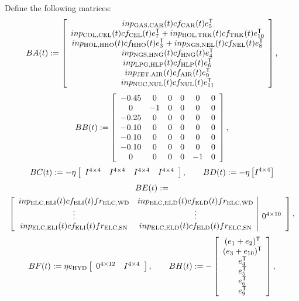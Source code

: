 Define the following matrices:
\[
BA(t)\assign \left[\ajfbox{%
inp_{\text{GAS,CAR}}(t)cf_{\text{CAR}}(t)e_{5}\trp\\
inp_{\text{COL,CEL}}(t)cf_{\text{CEL}}(t)e_{7}\trp + inp_{\text{HOL,TRK}}(t)cf_{\text{TRK}}(t)e_{10}\trp\\
inp_{\text{HOL,HHO}}(t)cf_{\text{HHO}}(t)e_{3}\trp + inp_{\text{NGS,NEL}}(t)cf_{\text{NEL}}(t)e_{8}\trp\\
inp_{\text{NGS,HNG}}(t)cf_{\text{HNG}}(t)e_{4}\trp\\
inp_{\text{LPG,HLP}}(t)cf_{\text{HLP}}(t)e_{6}\trp\\
inp_{\text{JET,AIR}}(t)cf_{\text{AIR}}(t)e_{9}\trp\\
inp_{\text{NUC,NUL}}(t)cf_{\text{NUL}}(t)e_{11}\trp%
}\right],
\]
\[
BB(t):= \left[\begin{array}{cccccc} -0.45 & 0 & 0 & 0 & 0 & 0\\
0 & -1 & 0 & 0 & 0 & 0\\
-0.25 & 0 & 0 & 0 & 0 & 0\\
-0.10 & 0 & 0 & 0 & 0 & 0\\
-0.10 & 0 & 0 & 0 & 0 & 0\\
-0.10 & 0 & 0 & 0 & 0 & 0\\
0 & 0 & 0 & 0 & -1 & 0\end{array} \right],
\]
\[
BC(t):= -\eta\left[\begin{array}{cccc} I^{4\times 4} & I^{4\times 4} & I^{4\times 4} & I^{4\times 4}\end{array}\right],\qquad BD(t):= -\eta \left[I^{4\times 4}\right]
\]
\begin{multline*}
BE(t)\assign \\ \left[\begin{array}{cc|c}%
inp_{\text{ELC,ELI}}(t)cf_{\text{ELI}}(t)fr_{\text{ELC,WD}} & inp_{\text{ELC,ELD}}(t)cf_{\text{ELD}}(t)fr_{\text{ELC,WD}} & \\
\vdots & \vdots & 0^{4\times 10}\\
inp_{\text{ELC,ELI}}(t)cf_{\text{ELI}}(t)fr_{\text{ELC,SN}} & inp_{\text{ELC,ELD}}(t)cf_{\text{ELD}}(t)fr_{\text{ELC,SN}} & \end{array}\right],
\end{multline*}
\[
BF(t):= \eta e_{\text{HYD}}\left[\begin{array}{cc}0^{4\times 12} & I^{4\times 4}\end{array}\right],\qquad BH(t):=-\left[\begin{array}{c}(e_{1} + e_{2})^{\mbox{\scriptsize\sf T}}\\
(e_{3}+e_{10})^{\mbox{\scriptsize\sf T}}\\
e_{4}^{\mbox{\scriptsize\sf T}}\\
e_{5}^{\mbox{\scriptsize\sf T}}\\
e_{6}^{\mbox{\scriptsize\sf T}}\\
e_{9}^{\mbox{\scriptsize\sf T}}\end{array}\right],
\]
